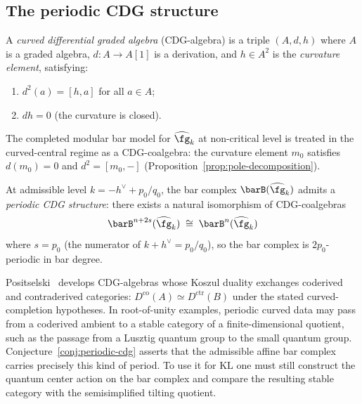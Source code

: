 \subsection{The periodic CDG structure}

\begin{definition}
\label{def:cdg-algebra}
A \emph{curved differential graded algebra} (CDG-algebra) is a
triple $(A, d, h)$ where $A$ is a graded algebra,
$d\colon A \to A[1]$ is a derivation, and $h \in A^2$ is the
\emph{curvature element}, satisfying:
\begin{enumerate}[label=\textup{(\roman*)}]
\item $d^2(a) = [h, a]$ for all $a \in A$;
\item $dh = 0$ (the curvature is closed).
\end{enumerate}
The completed modular bar model for $\widehat{\fg}_k$ at non-critical
level is treated in the curved-central regime as a CDG-coalgebra: the
curvature element $m_0$ satisfies $d(m_0) = 0$ and $d^2 = [m_0, -]$
(Proposition~\ref{prop:pole-decomposition}).
\end{definition}

\begin{conjecture}
\label{conj:periodic-cdg}
At admissible level $k = -h^\vee + p_0/q_0$, the bar complex
$\barB(\widehat{\fg}_k)$ admits a \emph{periodic CDG structure}:
there exists a natural isomorphism of CDG-coalgebras
\begin{equation}\label{eq:periodic-cdg}
\barB^{n + 2s}(\widehat{\fg}_k)
\;\cong\;
\barB^n(\widehat{\fg}_k)
\end{equation}
where $s = p_0$ \textup{(}the numerator of
$k + h^\vee = p_0/q_0$\textup{)}, so the bar complex is $2p_0$-periodic
in bar degree.
\end{conjecture}

\begin{remark}
\label{rem:positselski}
Positselski~\cite{Positselski11} develops CDG-algebras whose
Koszul duality exchanges coderived and contraderived categories:
$D^{\mathrm{co}}(A) \simeq D^{\mathrm{ctr}}(B)$ under the stated
curved-completion hypotheses. In root-of-unity examples, periodic
curved data may pass from a coderived ambient to a stable category of a
finite-dimensional quotient, such as the passage from a Lusztig
quantum group to the small quantum group. Conjecture~\ref{conj:periodic-cdg}
asserts that the admissible affine bar complex carries precisely this
kind of period. To use it for KL one must still construct the quantum
center action on the bar complex and compare the resulting stable
category with the semisimplified tilting quotient.
\end{remark}


